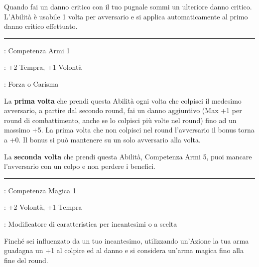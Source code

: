 \begin{multicols}{2}
Quando fai un danno critico con il tuo pugnale sommi un ulteriore danno critico. L'Abilità è usabile 1 volta per avversario e si applica automaticamente al primo danno critico effettuato.

\smallskip\noindent\rule{\linewidth}{2pt} \hypertarget{Questa è la mia arma!}{}\medskip{}
\noindent
\begin{description}[noitemsep, topsep=0pt, parsep=0pt, partopsep=0pt, leftmargin=0cm, labelwidth=2.5cm]
    \item[\textbf{Requisito}]: Competenza Armi 1
    \item[\textbf{Tiri Salvezza}]: +2 Tempra, +1 Volontà
    \item[\textbf{Caratteristica}]: Forza o Carisma
\end{description}

La \textbf{prima volta} che prendi questa Abilità ogni volta che colpisci il medesimo avversario, a partire dal secondo round, fai un danno aggiuntivo (Max +1 per round di combattimento, anche se lo colpisci più volte nel round) fino ad un massimo +5. La prima volta che non colpisci nel round l'avversario il bonus torna a +0. Il bonus si può mantenere su un solo avversario alla volta.

La \textbf{seconda volta} che prendi questa Abilità, Competenza Armi 5, puoi mancare l'avversario con un colpo e non perdere i benefici.

\smallskip\noindent\rule{\linewidth}{2pt} \hypertarget{Radici magiche}{}\medskip{}
\noindent
\begin{description}[noitemsep, topsep=0pt, parsep=0pt, partopsep=0pt, leftmargin=0cm, labelwidth=2.5cm]
    \item[\textbf{Requisito}]: Competenza Magica 1
    \item[\textbf{Tiri Salvezza}]: +2 Volontà, +1 Tempra
    \item[\textbf{Caratteristica}]: Modificatore di caratteristica per incantesimi o a scelta
\end{description}

Finché sei influenzato da un tuo incantesimo, utilizzando un'Azione la tua arma guadagna un +1 al colpire ed al danno e si considera un'arma magica fino alla fine del round.


\begin{center}


\end{center}
\end{multicols}
